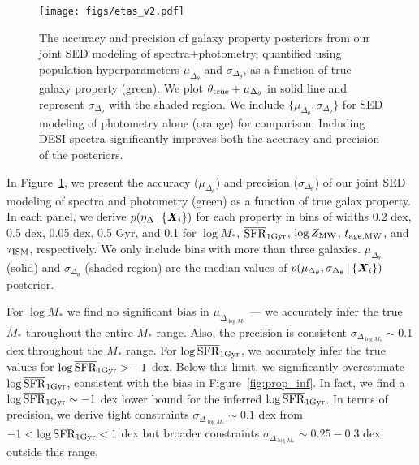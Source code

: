 \begin{figure}
\begin{center}
    \texttt{[image: figs/etas\_v2.pdf]} \label{fig:etas}
    \caption{
        The accuracy and precision of galaxy property posteriors from our
        joint SED modeling of spectra+photometry, quantified using population
        hyperparameters $\mu_{\Delta_{\theta}}$ and $\sigma_{\Delta_{\theta}}$,
        as a function of true galaxy property (green). 
        We plot $\theta_{\rm true} + \mu_{\Delta_{\theta}}$ in solid line and
        represent $\sigma_{\Delta_{\theta}}$ with the shaded region.
        We include $\{\mu_{\Delta_{\theta}}, \sigma_{\Delta_{\theta}}\}$ for SED
        modeling of photometry alone (orange) for comparison. 
        Including DESI spectra significantly improves both the accuracy and
        precision of the posteriors. 
    }
\end{center}
\end{figure}

In Figure~\ref{fig:etas}, we present the accuracy ($\mu_{\Delta_{\theta}}$) and
precision ($\sigma_{\Delta_{\theta}}$) of our joint SED modeling of spectra and
photometry (green) as a function of true galax property. 
In each panel, we derive $p(\eta_\Delta \,|\, \{{\textbf{\textit{X}}_i}\})$ for each
property in bins of widths 0.2 dex, 0.5 dex, 0.05 dex, 0.5 Gyr, and 0.1 for
$\log M_*$, $\overline{\rm SFR}_{\rm 1Gyr}$, $\log Z_{\rm MW}$, $t_{\rm age, MW}$, and $\tau_{\rm
ISM}$, respectively. 
We only include bins with more than three galaxies. 
$\mu_{\Delta_{\theta}}$ (solid) and $\sigma_{\Delta_{\theta}}$ (shaded region)
are the median values of $p(\mu_{\Delta_{\theta}}, \sigma_{\Delta_{\theta}}
\,|\, \{{\textbf{\textit{X}}_i}\})$ posterior. 

For $\log M_*$ we find no significant bias in $\mu_{\Delta_{\log M_*}}$ --- we
accurately infer the true $M_*$ throughout the entire $M_*$ range. 
Also, the precision is consistent $\sigma_{\Delta_{\log M_*}} \sim 0.1$ dex
throughout the $M_*$ range. 
For $\log \overline{\rm SFR}_{\rm 1Gyr}$, we accurately infer the true values for $\log \overline{\rm SFR}_{\rm 1Gyr} > -1$
dex.
Below this limit, we significantly overestimate $\log \overline{\rm SFR}_{\rm 1Gyr}$, consistent with
the bias in Figure~\ref{fig:prop_inf}. 
In fact, we find a $\log \overline{\rm SFR}_{\rm 1Gyr} \sim -1$ dex lower bound for the inferred
$\log \overline{\rm SFR}_{\rm 1Gyr}$. 
In terms of precision, we derive tight constraints $\sigma_{\Delta_{\log M_*}}
\sim 0.1$ dex from $-1 < \log \overline{\rm SFR}_{\rm 1Gyr} < 1$ dex but broader constraints
$\sigma_{\Delta_{\log M_*}} \sim 0.25 - 0.3$ dex outside this range. 

